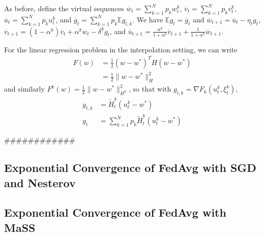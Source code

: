 As before, define the virtual sequences $\overline{w}_{t}=\sum_{k=1}^{N}p_{k}w_{t}^{k}$,
$\overline{v}_{t}=\sum_{k=1}^{N}p_{k}v_{t}^{k}$, $\overline{u}_{t}=\sum_{k=1}^{N}p_{k}u_{t}^{k}$,
and $\overline{g}_{t}=\sum_{k=1}^{N}p_{k}\mathbb{E}g_{t,k}$. We have
$\mathbb{E}g_{t}=\overline{g}_{t}$ and $\overline{w}_{t+1}=\overline{u}_{t}-\eta_{t}g_{t}$,
$\overline{v}_{t+1}=(1-\alpha^{k})\overline{v}_{t}+\alpha^{k}\overline{w}_{t}-\delta^{k}g_{t}$,
and $\overline{u}_{t+1}=\frac{\alpha^{k}}{1+\alpha^{k}}\overline{v}_{t+1}+\frac{1}{1+\alpha^{k}}\overline{w}_{t+1}$. 

For the linear regression problem in the interpolation setting, we
can write 
\begin{align*}
F(w) & =\frac{1}{2}(w-w^{\ast})^{T}H(w-w^{\ast})\\
& =\frac{1}{2}\|w-w^{\ast}\|_{H}^{2}
\end{align*}
and similarly $F^{k}(w)=\frac{1}{2}\|w-w^{\ast}\|_{H^{k}}^{2}$,
so that with $g_{t,k}=\nabla F_{k}(u_{t}^{k},\xi_{t}^{k})$,
\begin{align*}
g_{t,k} & =\tilde{H}_{t}^{k}(u_{t}^{k}-w^{\ast})\\
g_{t} & =\sum_{k=1}^{N}p_{k}\tilde{H}_{t}^{k}(u_{t}^{k}-w^{\ast})
\end{align*}

\#\#\#\#\#\#\#\#\#\#\#\#

\subsection{Exponential Convergence of FedAvg with SGD and Nesterov}

\subsection{Exponential Convergence of FedAvg with MaSS}


